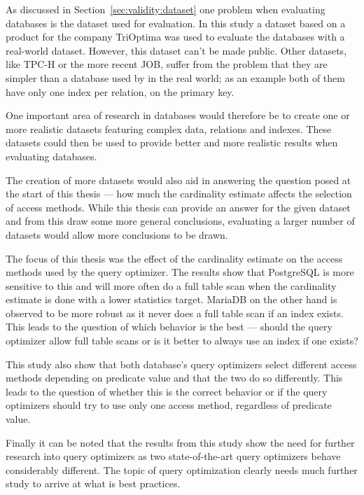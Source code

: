 As discussed in Section~\ref{sec:validity:dataset} one problem when evaluating
databases is the dataset used for evaluation. In this study a dataset based on a
product for the company TriOptima was used to evaluate the databases with a real-world
dataset. However, this dataset can't be made public. Other datasets, like TPC-H
or the more recent JOB, suffer from the problem that they are simpler
than a database used by in the real world; as an example both of them have only one
index per relation, on the primary key.

One important area of research in databases would therefore be to create one or
more realistic datasets featuring complex data, relations and indexes.
These datasets could then be used to provide better and more realistic results
when evaluating databases.

The creation of more datasets would also aid in answering the question posed at
the start of this thesis --- how much the cardinality estimate affects the selection
of access methods. While this thesis can provide an answer for the given dataset
and from this draw some more general conclusions, evaluating a larger number of
datasets would allow more conclusions to be drawn.

The focus of this thesis was the effect of the cardinality estimate on the
access methods used by the query optimizer. The results show that PostgreSQL is
more sensitive to this and will more often do a full table scan when the
cardinality estimate is done with a lower statistics target. MariaDB on the
other hand is observed to be more robust as it never does a full table scan if
an index exists. This leads to the question of which behavior is the best ---
should the query optimizer allow full table scans or is it better to always use
an index if one exists?

This study also show that both database's query optimizers select
different access methods depending on predicate value and that the two do so
differently. This leads to the question of whether this is the correct behavior
or if the query optimizers should try to use only one access method, regardless
of predicate value.

Finally it can be noted that the results from this study show the need for
further research into query optimizers as two state-of-the-art query optimizers
behave considerably different. The topic of query optimization clearly needs
much further study to arrive at what is best practices.
